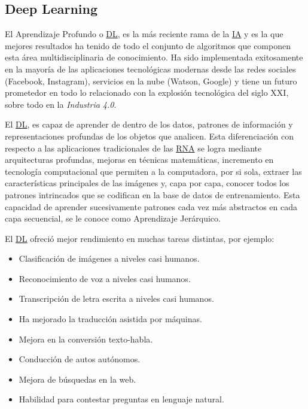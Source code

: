 \subsection{Deep Learning}

El Aprendizaje Profundo o \hyperlink{abbr}{DL}, es la más reciente rama de la
\hyperlink{abbr}{IA} y es la que mejores resultados ha tenido de todo el
conjunto de algoritmos que componen esta área multidisciplinaria de
conocimiento. Ha sido implementada exitosamente en la mayoría de las
aplicaciones tecnológicas modernas desde las redes sociales (Facebook,
Instagram), servicios en la nube (Watson, Google) y tiene un futuro prometedor
en todo lo relacionado con la explosión tecnológica del siglo XXI, sobre todo en la
\emph{Industria 4.0}.

El \hyperlink{abbr}{DL}, es capaz de aprender de dentro de los datos, patrones
de información y representaciones profundas de los objetos que analicen. Esta
diferenciación con respecto a las aplicaciones tradicionales de las
\hyperlink{abbr}{RNA} se logra mediante arquitecturas profundas, mejoras en
técnicas matemáticas, incremento en tecnología computacional que permiten a la
computadora, por si sola, extraer las características principales de las
imágenes y, capa por capa, conocer todos los patrones intrincados que se
codifican en la base de datos de entrenamiento. Esta capacidad de aprender
sucesivamente patrones cada vez más abstractos en cada capa secuencial, se le
conoce como Aprendizaje Jerárquico. 

El \hyperlink{abbr}{DL} ofreció mejor rendimiento en muchas tareas distintas,
por ejemplo:

\begin{itemize}
    \item Clasificación de imágenes a niveles casi humanos.
    \item Reconocimiento de voz a niveles casi humanos.
    \item Transcripción de letra escrita a niveles casi humanos.
    \item Ha mejorado la traducción asistida por máquinas.
    \item Mejora en la conversión texto-habla.
    \item Conducción de autos autónomos.
    \item Mejora de búsquedas en la web.
    \item Habilidad para contestar preguntas en lenguaje natural.
\end{itemize}

